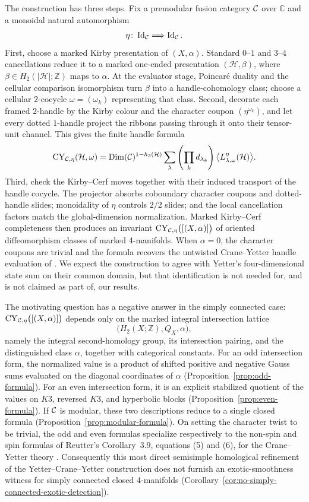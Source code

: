 The construction has three steps.  Fix a premodular fusion category $\mathcal{C}$ over
$\mathbb C$ and a monoidal natural automorphism
\[
  \eta\colon\operatorname{Id}_{\mathcal{C}}\Longrightarrow
  \operatorname{Id}_{\mathcal{C}}.
\]
First, choose a marked Kirby presentation of $(X,\alpha)$.  Standard
\(0\)--\(1\) and \(3\)--\(4\) cancellations reduce it to a marked one-ended
presentation $(\mathcal H,\beta)$, where
$\beta\in H_2(|\mathcal H|;\mathbb Z)$ maps to $\alpha$.  At the evaluator
stage, Poincar\'e duality and the cellular comparison isomorphism turn
$\beta$ into a handle-cohomology class; choose a cellular $2$-cocycle
$\omega=(\omega_k)$ representing that class.  Second, decorate each framed $2$-handle by the
Kirby colour and the character coupon $(\eta^{\omega_k})$, and let every dotted
$1$-handle project the ribbons passing through it onto their tensor-unit
channel.  This gives the finite handle formula
\[
  \operatorname{CY}_{\mathcal{C},\eta}(\mathcal H,\omega)
  =\operatorname{Dim}(\mathcal{C})^{1-h_3(\mathcal H)}
    \sum_{\lambda}
      \left(\prod_kd_{\lambda_k}\right)
      \bigl\langle L^\eta_{\lambda,\omega}(\mathcal H)\bigr\rangle.
\]
Third, check the Kirby--Cerf moves together with their induced transport of
the handle cocycle.  The projector absorbs coboundary character coupons and
dotted-handle slides; monoidality of $\eta$ controls $2/2$ slides; and the
local cancellation factors match the global-dimension normalization.
Marked Kirby--Cerf completeness then produces an invariant
$\operatorname{CY}_{\mathcal{C},\eta}\bigl([(X,\alpha)]\bigr)$ of oriented diffeomorphism classes of marked
4-manifolds.  When $\alpha=0$, the character coupons are trivial and the
formula recovers the untwisted Crane--Yetter handle evaluation of
\cite[Definition~5.11]{Tham2021}.  We expect the construction to agree with
Yetter's four-dimensional state sum on their common domain, but that
identification is not needed for, and is not claimed as part of, our results.

The motivating question has a negative answer in the simply connected case:
$\operatorname{CY}_{\mathcal{C},\eta}\bigl([(X,\alpha)]\bigr)$ depends only on the
marked integral intersection lattice
\[
  \bigl(H_2(X;\mathbb Z),Q_X,\alpha\bigr),
\]
namely the integral second-homology group, its intersection pairing, and the
distinguished class $\alpha$, together with categorical constants.  For an odd
intersection form, the normalized value is a product of shifted positive and
negative Gauss sums evaluated on the diagonal coordinates of $\alpha$
(Proposition~\ref{prop:odd-formula}).  For an even intersection form, it is an
explicit stabilized quotient of the values on $K3$, reversed $K3$, and
hyperbolic blocks (Proposition~\ref{prop:even-formula}).  If $\mathcal{C}$ is modular,
these two descriptions reduce to a single closed formula
(Proposition~\ref{prop:modular-formula}).  On setting the character twist to
be trivial, the odd and even formulas specialize respectively to the non-spin
and spin formulas of Reutter's Corollary~3.9, equations (5) and (6), for the
Crane--Yetter theory \cite{Reutter2023}.
Consequently this most direct semisimple homological refinement of the
Yetter--Crane--Yetter construction does not furnish an exotic-smoothness
witness for simply connected closed 4-manifolds
(Corollary~\ref{cor:no-simply-connected-exotic-detection}).

